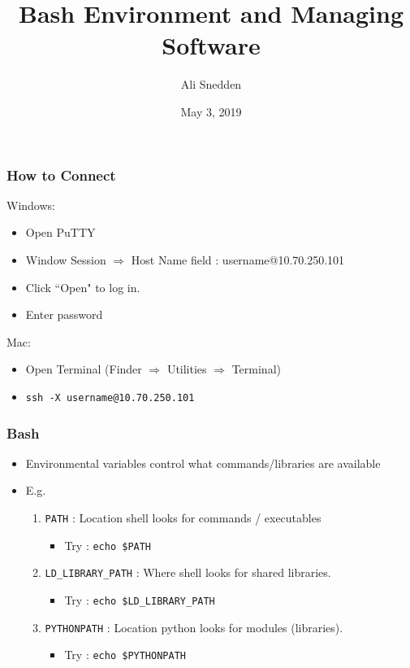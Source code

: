 \documentclass{beamer}
\title{Bash Environment and Managing Software}
\author{Ali Snedden}
\institute{Nationwide Children's Hospital}
\date{May 3, 2019}
\newcommand{\code}[1]{\colorbox{codegray}{\texttt{#1}}}
\begin{document}
 
\frame{\titlepage}




\begin{frame}
\frametitle{How to Connect}
Windows:
\begin{itemize}
    \item Open PuTTY
    \item Window Session $\Rightarrow$ Host Name field : username@10.70.250.101
    \item Click ``Open" to log in.
    \item Enter password
\end{itemize}

Mac:
\begin{itemize}
    \item Open Terminal (Finder $\Rightarrow$ Utilities $\Rightarrow$ Terminal)
    \item \code{ssh -X username@10.70.250.101}
\end{itemize}
\end{frame}



\begin{frame}
\frametitle{Bash}
\begin{itemize}
    \item Environmental variables control what commands/libraries are available
    \pause
    \item E.g.
    \pause
    \begin{enumerate}
        \item \code{PATH} : Location shell looks for commands / executables
        \pause
            \begin{itemize}
                \item Try : \code{echo \$PATH}
            \end{itemize}
        \pause
        \item \code{LD\_LIBRARY\_PATH} : Where shell looks for shared libraries.
            \begin{itemize}
                \item Try : \code{echo \$LD\_LIBRARY\_PATH}
            \end{itemize}
        \pause
        \item \code{PYTHONPATH} : Location python looks for modules (libraries).
            \begin{itemize}
                \item Try : \code{echo \$PYTHONPATH}
            \end{itemize}
    \end{enumerate}
\end{itemize}
\end{frame}
\end{document}
